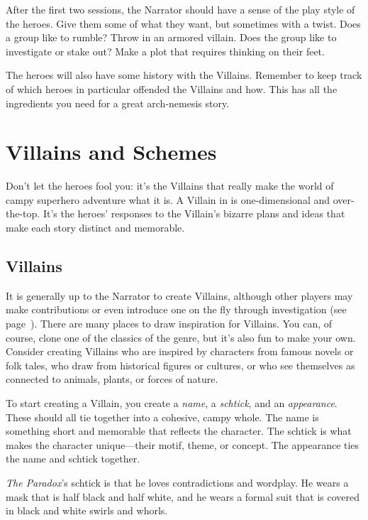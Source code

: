 \documentclass[letterpaper]{report}
\begin{document}
After the first two sessions, the Narrator should have a sense of the
play style of the heroes. Give them some of what they want, but
sometimes with a twist. Does a group like to rumble? Throw in an
armored villain. Does the group like to investigate or stake out? Make
a plot that requires thinking on their feet.

The heroes will also have some history with the Villains. Remember to
keep track of which heroes in particular offended the Villains and how.
This has all the ingredients you need for a great arch-nemesis story.


\chapter{Villains and Schemes}

Don't let the heroes fool you: it's the Villains that really make
the world of campy superhero adventure what it is.
A Villain in \kapow{} is one-dimensional and over-the-top. It's the
heroes' responses to the Villain's bizarre plans and ideas that
make each story distinct and memorable.

\section{Villains}

It is generally up to the Narrator to create Villains, although
other players may make contributions or even introduce one
on the fly through investigation (see page~\pageref{move:investigate}).
There are many places to draw inspiration for Villains.
You can, of course, clone one of the classics of the genre,
but it's also fun to make your own. Consider creating Villains
who are inspired by characters from famous novels or folk tales,
who draw from historical figures or cultures,
or who see themselves as connected to animals, plants, or forces of nature.

To start creating a Villain, you create a \emph{name}, a \emph{schtick},
and an \emph{appearance}.
These should all tie together into a cohesive, campy whole.
The name is something short and memorable that reflects the character.
The schtick is what makes the character unique---their motif, theme,
or concept. The appearance ties the name and schtick together.

\begin{example}
  \emph{The Paradox}'s schtick is that he loves contradictions
  and wordplay.
  He wears a mask that is half black and half white, and he wears
  a formal suit that is covered in black and white swirls and whorls.
\end{example}
\end{document}
